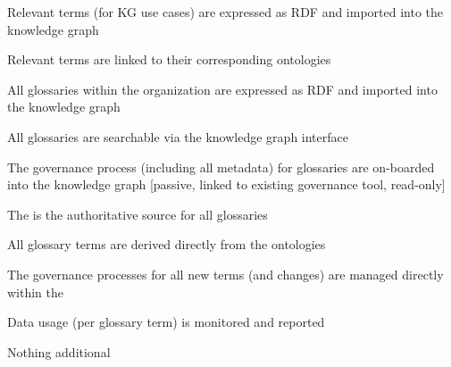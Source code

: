 \begin{members-only}
\begin{scoring}
  \item Relevant terms (for KG use cases) are expressed as RDF and imported into the knowledge graph
  \item Relevant terms are linked to their corresponding ontologies

\end{scoring}

\kgmmscoringlevelFour

\begin{scoring}

  \item All glossaries within the organization are expressed as RDF and imported into the knowledge graph
  \item All glossaries are searchable via the knowledge graph interface
  \item The governance process (including all metadata) for glossaries are on-boarded into the knowledge graph
        [passive, linked to existing governance tool, read-only]

\end{scoring}

\kgmmscoringlevelFive

\begin{scoring}

  \item The  is the authoritative source for all glossaries
  \item All glossary terms are derived directly from the ontologies
  \item The governance processes for all new terms (and changes) are managed directly within the 
  \item Data usage (per glossary term) is monitored and reported

\end{scoring}

\end{members-only}

Nothing additional
